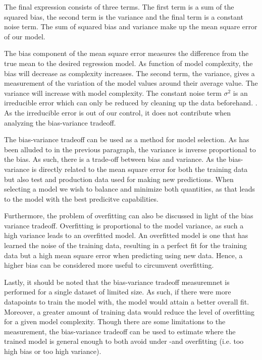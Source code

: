 \documentclass[11pt, a4paper]{article}
\begin{document}
The final expression consists of three terms. The first term is a sum of the squared bias, the second term is the variance and the final term is a constant noise term. The sum of squared bias and variance make up the mean square error of our model. \cite{Hastie2009} 

The bias component of the mean square error measures the difference from the true mean to the desired regression model. As function of model complexity, the bias will decrease as complexity increases. The second term, the variance, gives a measurement of the variation of the model values around their average value. The variance will increase with model complexity. The constant noise term $\sigma^2$ is an irreducible error which can only be reduced by cleaning up the data beforehand. \cite{Geron2019}. As the irreducible error is out of our control, it does not contribute when analyzing the bias-variance tradeoff. 

The bias-variance tradeoff can be used as a method for model selection. As has been alluded to in the previous paragraph, the variance is inverse proportional to the bias. As such, there is a trade-off between bias and variance. As the bias-variance is directly related to the mean square error for both the training data but also test and production data used for making new predictions. When selecting a model we wish to balance and minimize both quantities, as that leads to the model with the best predicitve capabilities. \cite{Bishop2016}

Furthermore, the problem of overfitting can also be discussed in light of the bias variance tradeoff. Overfitting is proportional to the model variance, as such a high variance leads to an overfitted model. An overfitted model is one that has learned the noise of the training data, resulting in a perfect fit for the training data but a high mean square error when predicting using new data. Hence, a higher bias can be considered more useful to circumvent overfitting.

Lastly, it should be noted that the bias-variance tradeoff measuremnet is performed for a single dataset of limited size. As such, if there were more datapoints to train the model with, the model would attain a better overall fit. Moreover, a greater amount of training data would reduce the level of overfitting for a given model complexity. \cite{Bishop2016} Though there are some limitations to the measurement, the bias-variance tradeoff can be used to estimate where the trained model is general enough to both avoid under -and overfitting (i.e. too high bias or too high variance).
\end{document}
